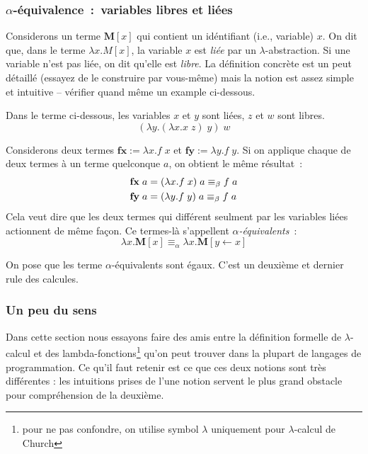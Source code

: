 \subsubsection*{$\alpha$-équivalence~:~variables libres et liées} \label{variables-libres-et-liees}



Considerons un terme $\mathbf{M}[x]$ qui contient un idéntifiant (i.e., variable) $x$.
On dit que, dans le terme $\lambda x.M[x]$, la variable $x$ est \emph{liée} par un $\lambda$-abstraction.
Si une variable n'est pas liée, on dit qu'elle est \emph{libre}.
La définition concrète est un peut détaillé (essayez de le construire par vous-même) mais la notion est assez simple et intuitive -- vérifier quand même un example ci-dessous.
\begin{example}
	Dans le terme ci-dessous, les variables $x$ et $y$ sont liées, $z$ et $w$ sont libres.
	$$(\lambda y. (\lambda x. x \; z) \; y) \; w$$
\end{example}
Considerons deux termes $\mathbf{fx} := \lambda x. f \; x$ et $\mathbf{fy} := \lambda y. f \; y$.
Si on applique chaque de deux termes à un terme quelconque $a$, on obtient le même résultat~:
\begin{align*}
	\mathbf{fx} \; a &= (\lambda x. f \; x) \; a \equiv_\beta f \; a \\
	\mathbf{fy} \; a &= (\lambda y. f \; y) \; a \equiv_\beta f \; a
\end{align*}
Cela veut dire que les deux termes qui différent seulment par les variables liées actionnent de même façon.
Ce termes-là s'appellent \emph{$\alpha$-équivalents}~:
$$\lambda x. \mathbf{M}[x] \equiv_\alpha \lambda x. \mathbf{M}[y \leftarrow x]$$

On pose que les terme $\alpha$-équivalents sont égaux.
C'est un deuxième et dernier rule des calcules.

\subsubsection*{Un peu du sens}
Dans cette section nous essayons faire des amis entre la définition formelle de $\lambda$-calcul et des lambda-fonctions\footnote{pour ne pas confondre, on utilise symbol $\lambda$ uniquement pour $\lambda$-calcul de Church} qu'on peut trouver dans la plupart de langages de programmation. Ce qu'il faut retenir est ce que ces deux notions sont très différentes : les intuitions prises de l'une notion servent le plus grand obstacle pour compréhension de la deuxième.

